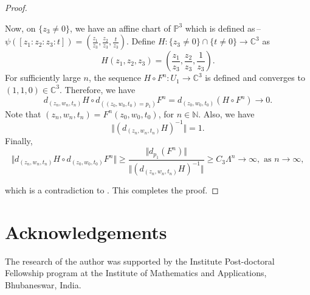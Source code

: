 \documentclass[12pt, reqno]{amsart}
\numberwithin{equation}{section}
\theoremstyle{definition}
\theoremstyle{remark}
\theoremstyle{plain}
\theoremstyle{definition}
\numberwithin{equation}{section}
\begin{document}
\begin{proof}
\begin{enumerate}
Now, on $\{z_3\not=0\}$, we have an affine chart of $\mathbb{P}^3$ which is defined as\,-- \\
$\psi\left([z_1:z_2:z_3:t]\right)=\left(\frac{z_1}{z_3},\frac{z_2}{z_3},\frac{t}{z_3}\right)$.
Define $H:\{z_{3}\not= 0\}\cap\{t\not=0\}\to\mathbb{C}^3$ as 
\[H(z_1,z_2,z_3)=\left(\frac{z_1}{z_3}, \frac{z_2}{z_3},\frac{1}{z_3}\right).\]
For sufficiently large $n$, the sequence $H\circ F^n: U_1\to\mathbb{C}^3$ is defined and converges to $(1,1,0)\in\mathbb{C}^3$. Therefore, we have
\begin{equation}\label{9}
d_{(z_n,w_n,t_n)}H\circ d_{((z_0,w_0,t_0)=p_1)}F^n=d_{(z_0,w_0,t_0)}(H\circ F^n)\to 0.
\end{equation}
Note that $(z_n,w_n,t_n)=F^n(z_0,w_0,t_0)$, for $n\in\mathbb{N}$. Also, we have 
\[\Vert(d_{(z_n,w_n,t_n)}H)^{-1}\Vert=1.\]
Finally, 
\[\Vert d_{(z_n,w_n,t_n)}H\circ d_{(z_0,w_0,t_0)}F^n\Vert\geq \frac{\Vert d_{p_1}(F^n)\Vert}{\Vert(d_{(z_n,w_n,t_n)}H)^{-1}\Vert}\geq C_3\Lambda^n\to\infty, \text{ as }n \to\infty,\]
\end{enumerate}
which is a contradiction to . This completes the proof.
\end{proof}

\section*{Acknowledgements}\vspace{-1mm}
The research of the author was supported by the Institute Post-doctoral Fellowship program at the Institute of Mathematics and Applications, Bhubaneswar, India.
 
\end{document}
